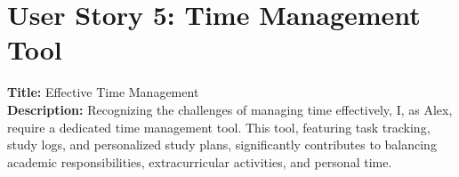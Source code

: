 \section{User Story 5: Time Management Tool}
\textbf{Title:} Effective Time Management \\
\textbf{Description:} Recognizing the challenges of managing time effectively, I, as Alex, require a dedicated time management tool. This tool, featuring task tracking, study logs, and personalized study plans, significantly contributes to balancing academic responsibilities, extracurricular activities, and personal time.